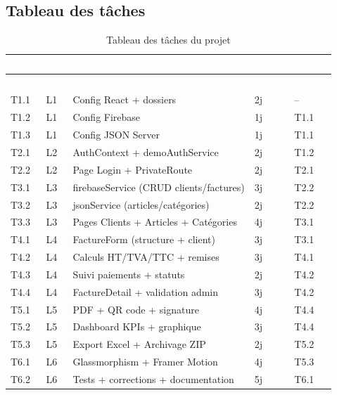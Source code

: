 \subsection{Tableau des tâches}

\begin{longtable}{|l|l|X|l|l|}
\caption{Tableau des tâches du projet} \label{tab:taches} \\
\hline
\rowcolor{emsiblue}\textcolor{white}{\textbf{Code}} & \textcolor{white}{\textbf{Lot}} & \textcolor{white}{\textbf{Tâche}} & \textcolor{white}{\textbf{Durée}} & \textcolor{white}{\textbf{Antér.}} \\
\hline
\endfirsthead
\hline
\rowcolor{emsiblue}\textcolor{white}{\textbf{Code}} & \textcolor{white}{\textbf{Lot}} & \textcolor{white}{\textbf{Tâche}} & \textcolor{white}{\textbf{Durée}} & \textcolor{white}{\textbf{Antér.}} \\
\hline
\endhead
T1.1 & L1 & Config React + dossiers & 2j & -- \\
T1.2 & L1 & Config Firebase & 1j & T1.1 \\
T1.3 & L1 & Config JSON Server & 1j & T1.1 \\
T2.1 & L2 & AuthContext + demoAuthService & 2j & T1.2 \\
T2.2 & L2 & Page Login + PrivateRoute & 2j & T2.1 \\
T3.1 & L3 & firebaseService (CRUD clients/factures) & 3j & T2.2 \\
T3.2 & L3 & jsonService (articles/catégories) & 2j & T2.2 \\
T3.3 & L3 & Pages Clients + Articles + Catégories & 4j & T3.1 \\
T4.1 & L4 & FactureForm (structure + client) & 3j & T3.1 \\
T4.2 & L4 & Calculs HT/TVA/TTC + remises & 3j & T4.1 \\
T4.3 & L4 & Suivi paiements + statuts & 2j & T4.2 \\
T4.4 & L4 & FactureDetail + validation admin & 3j & T4.2 \\
T5.1 & L5 & PDF + QR code + signature & 4j & T4.4 \\
T5.2 & L5 & Dashboard KPIs + graphique & 3j & T4.4 \\
T5.3 & L5 & Export Excel + Archivage ZIP & 2j & T5.2 \\
T6.1 & L6 & Glassmorphism + Framer Motion & 4j & T5.3 \\
T6.2 & L6 & Tests + corrections + documentation & 5j & T6.1 \\
\hline
\end{longtable}

